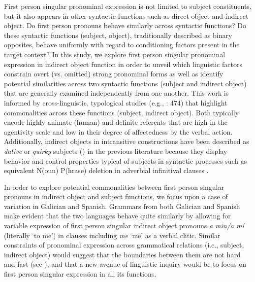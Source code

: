 \documentclass[output=paper]{langscibook}
\begin{document}
First person singular pronominal expression is not limited to subject constituents, but it also appears in other syntactic functions such as direct object and indirect object. Do first person pronouns behave similarly across syntactic functions? Do these syntactic functions (subject, object), traditionally described as binary opposites, behave uniformly with regard to conditioning factors present in the target context? In this study, we explore first person singular pronominal expression in indirect object function in order to unveil which linguistic factors constrain overt (vs. omitted) strong pronominal forms as well as identify potential similarities across two syntactic functions (subject and indirect object) that are generally examined independently from one another. This work is informed by cross-linguistic, typological studies (e.g., \citealt{Givón2001}: 474) that highlight commonalities across these functions (subject, indirect object). Both typically encode highly animate (human) and definite referents that are high in the agentivity scale and low in their degree of affectedness by the verbal action. Additionally, indirect objects in intransitive constructions have been described as \textit{dative} \citep{BhaskararaoSubbarao2004} or \textit{quirky} subjects (\citealt{Rivero2004, GuitiérrezBravo2006, Cuervo2010}) in the previous literature because they display behavior and control properties typical of subjects in syntactic processes such as equivalent N(oun) P(hrase) deletion in adverbial infinitival clauses \citep[1560]{Campos1999}. 

In order to explore potential commonalities between first person singular pronouns in indirect object and subject functions, we focus upon a case of variation in Galician and Spanish. Grammars from both Galician \parencites[110]{ÁlvarezXove2002}[126]{FreixeiroMato2006} and Spanish \parencites[199]{AlarcosLlorach1994}[1872]{GutiérrezOrdoñez1999} make evident that the two languages behave quite similarly by allowing for variable expression of first person singular indirect object pronouns \textit{a min\slash a mí} (literally ‘to me’) in clauses including \textit{me} ‘me’ as a verbal clitic. Similar constraints of pronominal expression across grammatical relations (i.e., subject, indirect object) would suggest that the boundaries between them are not hard and fast (see  \citealt{AijónOliva2017,AijónOliva2018,AijónOliva2019,Serrano2017,Serrano2018}), and that a new avenue of linguistic inquiry would be to focus on first person singular expression in all its functions. 
\end{document}

